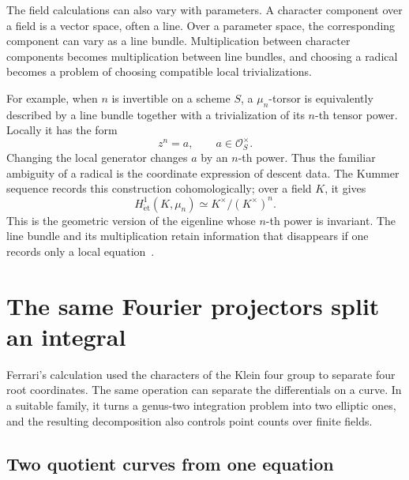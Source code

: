 \documentclass[11pt]{article}
\theoremstyle{remark}
\begin{document}
The field calculations can also vary with parameters. A character component over a field is a vector space, often a line. Over a parameter space, the corresponding component can vary as a line bundle. Multiplication between character components becomes multiplication between line bundles, and choosing a radical becomes a problem of choosing compatible local trivializations.

For example, when \(n\) is invertible on a scheme \(S\), a \(\mu_n\)-torsor is equivalently described by a line bundle together with a trivialization of its \(n\)-th tensor power. Locally it has the form
\[
z^n=a,\qquad a\in\mathcal O_S^\times.
\]
Changing the local generator changes \(a\) by an \(n\)-th power. Thus the familiar ambiguity of a radical is the coordinate expression of descent data. The Kummer sequence records this construction cohomologically; over a field \(K\), it gives
\[
H^1_{\mathrm{\acute et}}(K,\mu_n)
\simeq K^\times/(K^\times)^n.
\]
This is the geometric version of the eigenline whose \(n\)-th power is invariant. The line bundle and its multiplication retain information that disappears if one records only a local equation~\cite{stacks-kummer}.


\section{The same Fourier projectors split an integral}
\label{geometry:genus-two}

Ferrari's calculation used the characters of the Klein four group to separate four root coordinates. The same operation can separate the differentials on a curve. In a suitable family, it turns a genus-two integration problem into two elliptic ones, and the resulting decomposition also controls point counts over finite fields.

\subsection{Two quotient curves from one equation}
\end{document}
